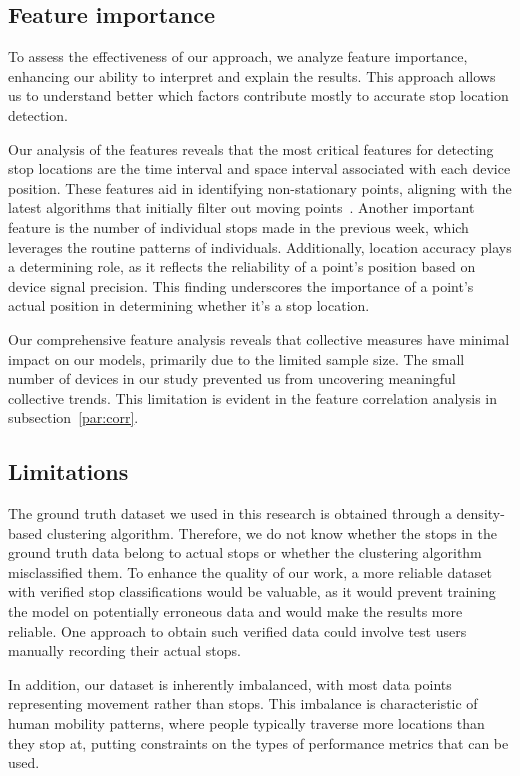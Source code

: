 \documentclass{article}
\begin{document}
\subsection{Feature importance}\label{par:feature}

To assess the effectiveness of our approach, we analyze feature importance, enhancing our ability to interpret and explain the results. This approach allows us to understand better which factors contribute mostly to accurate stop location detection.

Our analysis of the features reveals that the most critical features for detecting stop locations are the time interval and space interval associated with each device position. These features aid in identifying non-stationary points, aligning with the latest algorithms that initially filter out moving points~\citep{Ramaswamy2004}. Another important feature is the number of individual stops made in the previous week, which leverages the routine patterns of individuals. Additionally, location accuracy plays a determining role, as it reflects the reliability of a point's position based on device signal precision. This finding underscores the importance of a point's actual position in determining whether it's a stop location.

Our comprehensive feature analysis reveals that collective measures have minimal impact on our models, primarily due to the limited sample size. The small number of devices in our study prevented us from uncovering meaningful collective trends. This limitation is evident in the feature correlation analysis in subsection~\ref{par:corr}.



\subsection{Limitations}\label{par:limitation}
The ground truth dataset we used in this research is obtained through a density-based clustering algorithm. Therefore, we do not know whether the stops in the ground truth data belong to actual stops or whether the clustering algorithm misclassified them. To enhance the quality of our work, a more reliable dataset with verified stop classifications would be valuable, as it would prevent training the model on potentially erroneous data and would make the results more reliable. One approach to obtain such verified data could involve test users manually recording their actual stops.

In addition, our dataset is inherently imbalanced, with most data points representing movement rather than stops. This imbalance is characteristic of human mobility patterns, where people typically traverse more locations than they stop at, putting constraints on the types of performance metrics that can be used.
\end{document}
